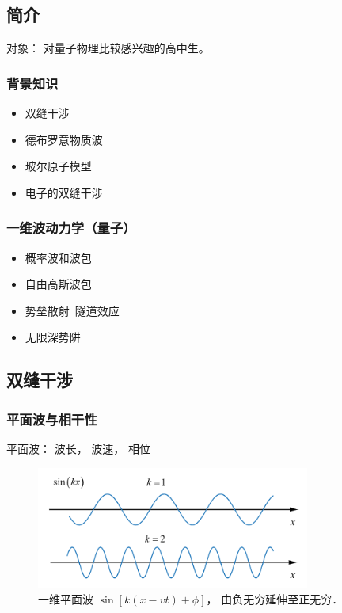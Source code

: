 
\subsection{简介}
对象： 对量子物理比较感兴趣的高中生。

\subsubsection{背景知识}
\begin{itemize}
\item 双缝干涉
\item 德布罗意物质波
\item 玻尔原子模型
\item 电子的双缝干涉
\end{itemize}

\subsubsection{一维波动力学（量子）}
\begin{itemize}
\item 概率波和波包
\item 自由高斯波包
\item 势垒散射\ 隧道效应
\item 无限深势阱
\end{itemize}

\subsection{双缝干涉}

\subsubsection{平面波与相干性}

平面波： 波长， 波速， 相位
\begin{figure}[ht]
\centering
\includegraphics[width=9cm]{./figures/QMIntr2.png}
\caption{一维平面波 $\sin[k(x-vt) + \phi]$， 由负无穷延伸至正无穷．} \label{QMIntr_fig2}
\end{figure}

